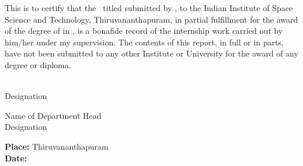 This is to certify that the \Doctype\  titled \textbf{\Title} 
submitted by {\bf\Author}, to the Indian Institute of Space Science 
and Technology, Thiruvananthapuram, in partial fulfillment for the 
award of the degree of {\bf\Degreetext} in { \bf\Specialization}, is 
a bonafide record of the internship work carried out by him/her 
under my supervision. The contents of this report, in full or in 
parts, have not been submitted to any other Institute or University 
for the award of any degree or diploma. 

\vspace{35mm}
\noindent
\begin{minipage}{0.5\textwidth}
\Advisor\\
Designation
\end{minipage}
\hspace{35mm}
\begin{minipage}{0.5\textwidth}
\raggedright{Name of Department Head}\\
Designation
\end{minipage}

\vspace{30mm}
\noindent
\textbf{Place: }Thiruvananthapuram\\
\textbf{Date: \ }\Date



